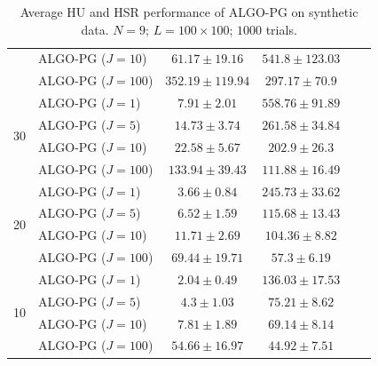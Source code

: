 \begin{table}[h]
\begin{adjustbox}{max width=\textwidth}
\begin{tabular}{|c|l|c|c|c|c|}
                    & ALGO-PG ($J=10$)           & $61.17    \pm 19.16$  & $541.8    \pm 123.03$ \tabularnewline
                    & ALGO-PG ($J=100$)          & $352.19   \pm 119.94$ & $297.17   \pm 70.9$   \tabularnewline \cline{1-4}
\multirow{4}{*}{30} & ALGO-PG ($J=1$)            & $7.91     \pm 2.01$   & $558.76   \pm 91.89$  \tabularnewline
                    & ALGO-PG ($J=5$)            & $14.73    \pm 3.74$   & $261.58   \pm 34.84$  \tabularnewline
                    & ALGO-PG ($J=10$)           & $22.58    \pm 5.67$   & $202.9    \pm 26.3$   \tabularnewline
                    & ALGO-PG ($J=100$)          & $133.94   \pm 39.43$  & $111.88   \pm 16.49$  \tabularnewline \cline{1-4}
\multirow{4}{*}{20} & ALGO-PG ($J=1$)            & $3.66     \pm 0.84$   & $245.73   \pm 33.62$  \tabularnewline
                    & ALGO-PG ($J=5$)            & $6.52     \pm 1.59$   & $115.68   \pm 13.43$  \tabularnewline
                    & ALGO-PG ($J=10$)           & $11.71    \pm 2.69$   & $104.36   \pm 8.82$   \tabularnewline
                    & ALGO-PG ($J=100$)          & $69.44    \pm 19.71$  & $57.3     \pm 6.19$   \tabularnewline \cline{1-4}
\multirow{4}{*}{10} & ALGO-PG ($J=1$)            & $2.04     \pm 0.49$   & $136.03   \pm 17.53$  \tabularnewline
                    & ALGO-PG ($J=5$)            & $4.3      \pm 1.03$   & $75.21    \pm 8.62$   \tabularnewline
                    & ALGO-PG ($J=10$)           & $7.81     \pm 1.89$   & $69.14    \pm 8.14$   \tabularnewline
                    & ALGO-PG ($J=100$)          & $54.66    \pm 16.97$  & $44.92    \pm 7.51$   \tabularnewline \cline{1-4}
\end{tabular}                                                                                                                                                  
\end{adjustbox}                                                                                                                                                
\caption{Average HU and HSR performance of ALGO-PG on synthetic data.                                                                                        
         $N = 9$; $L = 100 \times 100$; $1000$ trials.}                                                                                            
\label{table:results_full_PG_MO9}
\end{table}

